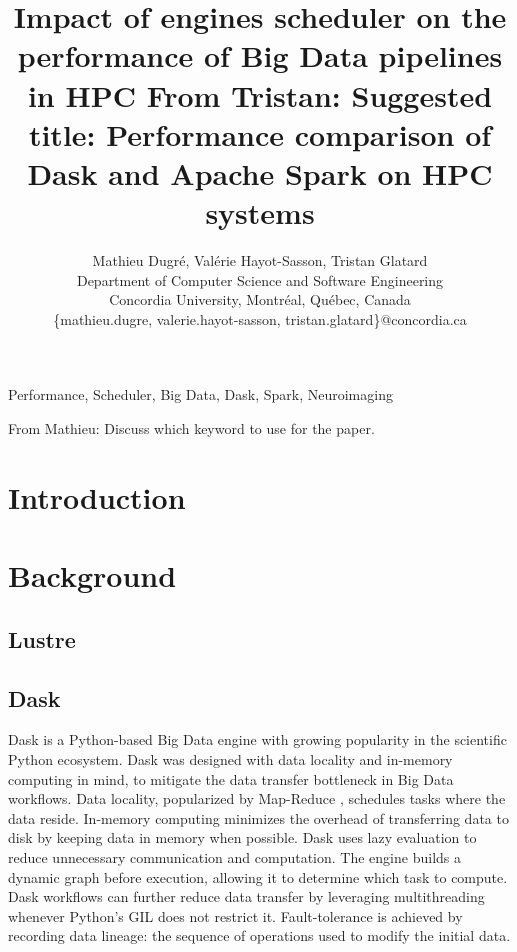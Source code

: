 \documentclass[conference]{IEEEtran}
\newcommand{\TG}[1]{\color{cyan}From Tristan: #1 \color{black}}
\newcommand{\MD}[1]{\color{magenta}From Mathieu: #1 \color{black}}
\begin{document}
\title{Impact of engines scheduler on the performance of Big Data pipelines in HPC \TG{Suggested title: Performance comparison of Dask and Apache Spark on HPC systems}}

\author{Mathieu Dugr\'e, Val\'erie Hayot-Sasson, Tristan Glatard\\
	Department of Computer Science and Software Engineering\\
	Concordia University, Montr\'eal, Qu\'ebec, Canada\\
	\{mathieu.dugre, valerie.hayot-sasson, tristan.glatard\}@concordia.ca
	\vspace*{0.8cm} %
}

\maketitle

\begin{abstract}
\end{abstract}

\begin{IEEEkeywords}
	Performance, Scheduler, Big Data, Dask, Spark, Neuroimaging
\end{IEEEkeywords}
\MD{Discuss which keyword to use for the paper.}

\section{Introduction}

\section{Background}
\subsection{Lustre} %

\subsection{Dask}
Dask is a Python-based Big Data engine with growing popularity in the scientific Python ecosystem.
Dask was designed with data locality and in-memory computing in mind, to mitigate the data transfer bottleneck in Big Data workflows.
Data locality, popularized by Map-Reduce \cite{dean2008mapreduce}, schedules tasks where the data reside.
In-memory computing minimizes the overhead of transferring data to disk by keeping data in memory when possible.
Dask uses lazy evaluation to reduce unnecessary communication and computation.
The engine builds a dynamic graph before execution, allowing it to determine which task to compute.
Dask workflows can further reduce data transfer by leveraging multithreading whenever Python's GIL does not restrict it.
Fault-tolerance is achieved by recording data lineage: the sequence of operations used to modify the initial data.
\end{document}
